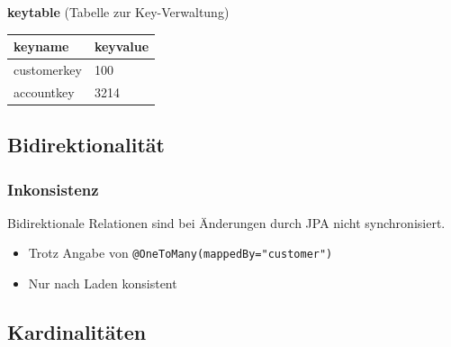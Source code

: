 \documentclass[a4paper, landscape, 8pt]{scrartcl}
\begin{document}
\begin{multicols*}{4}
        \textbf{keytable} (Tabelle zur Key-Verwaltung)\\
        \begin{tabularx}{\columnwidth}{l | X}
            \textbf{keyname} & \textbf{keyvalue} \\
            \hline
            customerkey & 100 \\
            \hline
            accountkey & 3214
        \end{tabularx}

        \subsection{Bidirektionalität}
        \subsubsection{Inkonsistenz}
        Bidirektionale Relationen sind bei Änderungen durch JPA nicht synchronisiert.
        \begin{itemize}
            \item Trotz Angabe von \texttt{@OneToMany(mappedBy="customer")}
            \item Nur nach Laden konsistent
        \end{itemize}

        \subsection{Kardinalitäten}

\end{multicols*}
\end{document}
